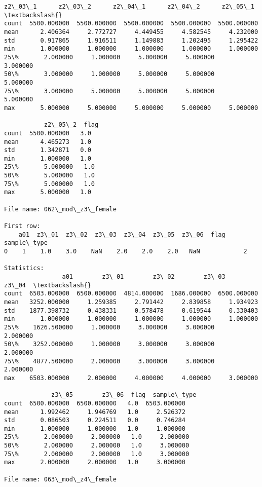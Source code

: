 \documentclass[11pt]{article}
\begin{document}
\begin{Verbatim}[commandchars=\\\{\}]
           z2\_03\_1      z2\_03\_2      z2\_04\_1      z2\_04\_2      z2\_05\_1  \textbackslash{}
count  5500.000000  5500.000000  5500.000000  5500.000000  5500.000000   
mean      2.406364     2.772727     4.449455     4.582545     4.232000   
std       0.917865     1.916511     1.149883     1.202495     1.295422   
min       1.000000     1.000000     1.000000     1.000000     1.000000   
25\%       2.000000     1.000000     5.000000     5.000000     3.000000   
50\%       3.000000     1.000000     5.000000     5.000000     5.000000   
75\%       3.000000     5.000000     5.000000     5.000000     5.000000   
max       5.000000     5.000000     5.000000     5.000000     5.000000   

           z2\_05\_2  flag  
count  5500.000000   3.0  
mean      4.465273   1.0  
std       1.342871   0.0  
min       1.000000   1.0  
25\%       5.000000   1.0  
50\%       5.000000   1.0  
75\%       5.000000   1.0  
max       5.000000   1.0  

File name: 062\_mod\_z3\_female

First row: 
    a01  z3\_01  z3\_02  z3\_03  z3\_04  z3\_05  z3\_06  flag  sample\_type
0    1    1.0    3.0    NaN    2.0    2.0    2.0   NaN            2

Statistics: 
                a01        z3\_01        z3\_02        z3\_03        z3\_04  \textbackslash{}
count  6503.000000  6500.000000  4814.000000  1686.000000  6500.000000   
mean   3252.000000     1.259385     2.791442     2.839858     1.934923   
std    1877.398732     0.438331     0.578478     0.619544     0.330403   
min       1.000000     1.000000     1.000000     1.000000     1.000000   
25\%    1626.500000     1.000000     3.000000     3.000000     2.000000   
50\%    3252.000000     1.000000     3.000000     3.000000     2.000000   
75\%    4877.500000     2.000000     3.000000     3.000000     2.000000   
max    6503.000000     2.000000     4.000000     4.000000     3.000000   

             z3\_05        z3\_06  flag  sample\_type  
count  6500.000000  6500.000000   4.0  6503.000000  
mean      1.992462     1.946769   1.0     2.526372  
std       0.086503     0.224511   0.0     0.746284  
min       1.000000     1.000000   1.0     1.000000  
25\%       2.000000     2.000000   1.0     2.000000  
50\%       2.000000     2.000000   1.0     3.000000  
75\%       2.000000     2.000000   1.0     3.000000  
max       2.000000     2.000000   1.0     3.000000  

File name: 063\_mod\_z4\_female


\end{Verbatim}
\end{document}
